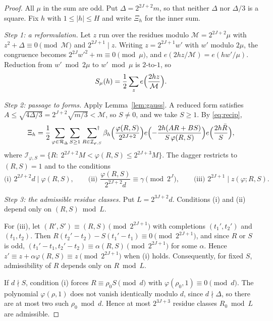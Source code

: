 \documentclass[11pt]{amsart}
\theoremstyle{remark}
\theoremstyle{definition}
\numberwithin{equation}{section}
\begin{document}
\begin{proof}
All $\mu$ in the sum are odd. Put $\Delta=2^{2J+2}m$, so that neither $\Delta$ nor $\Delta/3$ is a square. Fix $h$ with $1\le|h|\le H$ and write $\Xi_h$ for the inner sum.

\emph{Step 1: a reformulation.} Let $z$ run over the residues modulo $\mathcal M=2^{2J+2}\mu$ with $z^2+\Delta\equiv0\pmod{\mathcal M}$ and $2^{2J+1}\mid z$. Writing $z=2^{2J+1}w'$ with $w'$ modulo $2\mu$, the congruence becomes $2^{2J}w'^2+m\equiv0\pmod\mu$, and $e(2hz/\mathcal M)=e(hw'/\mu)$. Reduction from $w'\bmod2\mu$ to $w'\bmod\mu$ is $2$-to-$1$, so
\[
S_\mu(h)=\frac12\sum_{z}e\Bigl(\frac{2hz}{\mathcal M}\Bigr).
\]

\emph{Step 2: passage to forms.} Apply Lemma~\ref{lem:gauss}. A reduced form satisfies $A\le\sqrt{4\Delta/3}=2^{J+2}\sqrt{m/3}<\mathcal M$, so $S\ne0$, and we take $S\ge1$. By \eqref{eq:recip},
\[
\Xi_h=\frac12\sum_{\varphi\in\mathcal R_\Delta}\sum_{S\ge1}\ \sideset{}{^\dagger}\sum_{R\in\mathcal I_{\varphi,S}}\beta_h\Bigl(\frac{\varphi(R,S)}{2^{2J+2}}\Bigr)e\Bigl(-\frac{2h(AR+BS)}{S\,\varphi(R,S)}\Bigr)e\Bigl(\frac{2h\bar R}{S}\Bigr),
\]
where $\mathcal I_{\varphi,S}=\{R:\ 2^{2J+2}M<\varphi(R,S)\le2^{2J+3}M\}$. The dagger restricts to $(R,S)=1$ and to the conditions
\begin{equation}\label{eq:conds}
\text{(i) } 2^{2J+2}d\mid\varphi(R,S),\qquad\text{(ii) }\frac{\varphi(R,S)}{2^{2J+2}d}\equiv\gamma\pmod{2^J},\qquad\text{(iii) } 2^{2J+1}\mid z(\varphi;R,S).
\end{equation}

\emph{Step 3: the admissible residue classes.} Put $L=2^{3J+2}d$. Conditions (i) and (ii) depend only on $(R,S)\bmod L$.

For (iii), let $(R',S')\equiv(R,S)\pmod{2^{2J+1}}$ with completions $(t_1',t_2')$ and $(t_1,t_2)$. Then $R(t_2'-t_2)-S(t_1'-t_1)\equiv0\pmod{2^{2J+1}}$, and since $R$ or $S$ is odd, $(t_1'-t_1,t_2'-t_2)\equiv\alpha(R,S)\pmod{2^{2J+1}}$ for some $\alpha$. Hence $z'\equiv z+\alpha\varphi(R,S)\equiv z\pmod{2^{2J+1}}$ when (i) holds. Consequently, for fixed $S$, admissibility of $R$ depends only on $R\bmod L$.

If $d\nmid S$, condition (i) forces $R\equiv\rho_0S\pmod d$ with $\varphi(\rho_0,1)\equiv0\pmod d$. The polynomial $\varphi(\rho,1)$ does not vanish identically modulo $d$, since $d\nmid\Delta$, so there are at most two such $\rho_0\bmod d$. Hence at most $2^{3J+3}$ residue classes $R_0\bmod L$ are admissible.


\end{proof}
\end{document}
